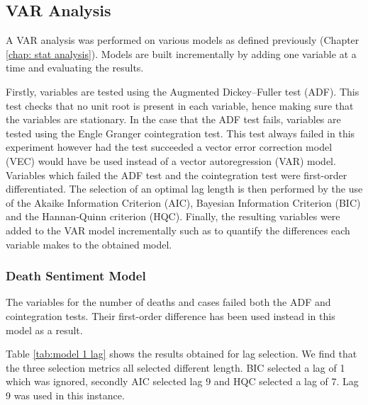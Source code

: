 \subsection{VAR Analysis}

A VAR analysis was performed on various models as defined previously (Chapter \ref{chap: stat analysis}). Models are built incrementally by adding one variable at a time and evaluating the results.

Firstly, variables are tested using the Augmented Dickey–Fuller test (ADF). This test checks that no unit root is present in each variable, hence making sure that the variables are stationary. In the case that the ADF test fails, variables are tested using the Engle Granger cointegration test. This test always failed in this experiment however had the test succeeded a vector error correction model (VEC) would have be used instead of a vector autoregression (VAR) model. Variables which failed the ADF test and the cointegration test were first-order differentiated. The selection of an optimal lag length is then performed by the use of the Akaike Information Criterion (AIC), Bayesian Information Criterion (BIC) and the Hannan-Quinn criterion (HQC). Finally, the resulting variables were added to the VAR model incrementally such as to quantify the differences each variable makes to the obtained model.

\subsubsection{Death Sentiment Model}

The variables for the number of deaths and cases failed both the ADF and cointegration tests. Their first-order difference has been used instead in this model as a result.

Table \ref{tab:model 1 lag} shows the results obtained for lag selection. We find that the three selection metrics all selected different length. BIC selected a lag of 1 which was ignored, secondly AIC selected lag 9 and HQC selected a lag of 7. Lag 9 was used in this instance.

